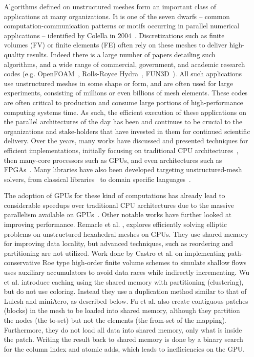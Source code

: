 \noindent
Algorithms defined on unstructured meshes form an important 
class of applications at many organizations. It is one of the seven dwarfs -- 
common computation-communication patterns or motifs occurring in parallel 
numerical applications -- identified by Colella in 2004~\cite{Colella2004}. 
Discretizations such as finite volumes (FV) or finite elements (FE) often rely 
on these meshes to deliver high-quality results. Indeed there is a large number 
of papers detailing such algorithms, and a wide range of commercial, government, 
and academic research codes (e.g. OpenFOAM~\cite{OpenFoamUserGuide}, Rolls-Royce 
Hydra~\cite{moinier2002edge}, FUN3D~\cite{biedron2017fun3d}). All such 
applications use unstructured meshes in some shape or form, and are often used 
for large experiments, consisting of millions or even billions of mesh elements. 
These codes are often critical to production and consume large portions of 
high-performance computing systems time. As such, the efficient execution of 
these applications on the parallel architectures of the day has been and 
continues to be crucial to the organizations and stake-holders that have 
invested in them for continued scientific delivery. Over the years, many works 
have discussed and presented techniques for efficient implementations, initially 
focusing on traditional CPU architectures~\cite{mavriplis2002parallel, 
jin1999openmp}, then many-core processors such as GPUs, and 
even architectures such as FPGAs~\cite{nagy2014accelerating, 
akamine2012reconfigurable}. Many libraries have also been developed targeting 
unstructured-mesh solvers, from classical libraries~\cite{trilinos, PETSc} to domain specific 
languages~\cite{devito2011liszt, giles2012op2, pyfr2016}. 

The adoption of GPUs for these kind of computations has already lead to 
considerable speedups over traditional CPU architectures due to the 
massive parallelism available on GPUs~\cite{Reguly2015, ELSEN200810148, 
cohen2009fast}. Other notable works have further looked at improving 
performance. Remacle et al. \cite{remacle2016gpu}, explores efficiently solving 
elliptic problems on unstructured hexahedral meshes on GPUs. They use shared 
memory for improving data locality, but advanced techniques, such as reordering 
and partitioning are not utilized. Work done by Castro et al. 
\cite{shallow_water} on implementing path-conservative Roe type high-order 
finite volume schemes to simulate shallow flows uses auxiliary accumulators to 
avoid data races while indirectly incrementing. Wu et al. 
\cite{wu2013complexity} introduce caching using the shared memory with 
partitioning (clustering), but do not use coloring. Instead they use a 
duplication method similar to that of Lulesh and miniAero, as described below. 
Fu et al. \cite{fu2014architecting} also create contiguous patches (blocks) in 
the mesh to be loaded into shared memory, although they partition the nodes (the 
to-set) but not the elements (the from-set of the mapping). Furthermore, they do 
not load all data into shared memory, only what is inside the patch. Writing the 
result back to shared memory is done by a binary search for the column index and 
atomic adds, which leads to inefficiencies on the GPU. 

